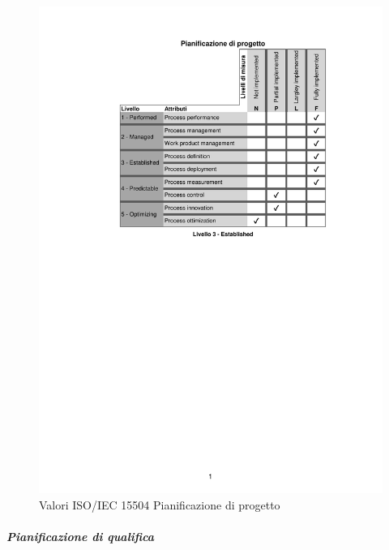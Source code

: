 \begin{figure}[H]
	\centering
	\includegraphics[scale=1]{images/resoconto/RR/pianificazioneprogetto-RR.pdf}
	\caption{Valori ISO/IEC 15504 Pianificazione di progetto}	
\end{figure}
\newpage
\subparagraph{Pianificazione di qualifica}
\noindent
